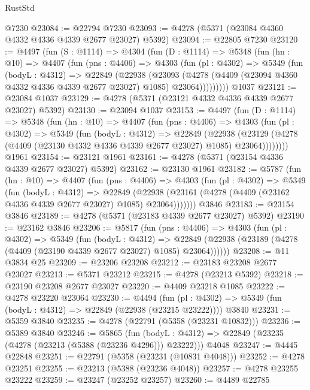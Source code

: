 \begin{lexlean}{RustStd}
\begin{coremodule}
{\begin{coremodule}
{{{{{{{{{{{{{{{{{{{{{{{{{{{{{{{{{{{    @7230
@23084 := @22794 @7230
@23093 := @4278 (@5371 (@23084 @4360 @4332 @4336 @4339 @2677 @23027) @5392)
@23094 := @22805 @7230
@23120 := @4497
    (fun (S : @1114) =>
    @4304
      (fun (D : @1114) =>
      @5348
        (fun (hn : @10) =>
        @4407
          (fun (pns : @4406) =>
          @4303
            (fun (pl : @4302) =>
            @5349
              (fun (bodyL : @4312) =>
              @22849
                (@22938
                  (@23093
                    (@4278
                      (@4409 (@23094 @4360 @4332 @4336 @4339 @2677 @23027) @1085)
                      @23064)))))))))
    @1037
@23121 := @23084 @1037
@23129 := @4278 (@5371 (@23121 @4332 @4336 @4339 @2677 @23027) @5392)
@23130 := @23094 @1037
@23153 := @4497
    (fun (D : @1114) =>
    @5348
      (fun (hn : @10) =>
      @4407
        (fun (pns : @4406) =>
        @4303
          (fun (pl : @4302) =>
          @5349
            (fun (bodyL : @4312) =>
            @22849
              (@22938
                (@23129 (@4278 (@4409 (@23130 @4332 @4336 @4339 @2677 @23027) @1085) @23064))))))))
    @1961
@23154 := @23121 @1961
@23161 := @4278 (@5371 (@23154 @4336 @4339 @2677 @23027) @5392)
@23162 := @23130 @1961
@23182 := @5787
    (fun (hn : @10) =>
    @4407
      (fun (pns : @4406) =>
      @4303
        (fun (pl : @4302) =>
        @5349
          (fun (bodyL : @4312) =>
          @22849
            (@22938 (@23161 (@4278 (@4409 (@23162 @4336 @4339 @2677 @23027) @1085) @23064)))))))
    @3846
@23183 := @23154 @3846
@23189 := @4278 (@5371 (@23183 @4339 @2677 @23027) @5392)
@23190 := @23162 @3846
@23206 := @5817
    (fun (pns : @4406) =>
    @4303
      (fun (pl : @4302) =>
      @5349
        (fun (bodyL : @4312) =>
        @22849 (@22938 (@23189 (@4278 (@4409 (@23190 @4339 @2677 @23027) @1085) @23064))))))
@23208 := @11 @3834 @25
@23209 := @23206 @23208
@23212 := @23183 @23208 @2677 @23027
@23213 := @5371 @23212
@23215 := @4278 (@23213 @5392)
@23218 := @23190 @23208 @2677 @23027
@23220 := @4409 @23218 @1085
@23222 := @4278 @23220 @23064
@23230 := @4494
    (fun (pl : @4302) => @5349 (fun (bodyL : @4312) => @22849 (@22938 (@23215 @23222))))
    @3840
@23231 := @5359 @3840
@23235 := @4278 (@22791 (@5358 (@23231 @10832)))
@23236 := @5389 @3840
@23246 := @5865
    (fun (bodyL : @4312) => @22849 (@23235 (@4278 (@23213 (@5388 (@23236 @4296))) @23222)))
    @4048
@23247 := @4445 @22848
@23251 := @22791 (@5358 (@23231 (@10831 @4048)))
@23252 := @4278 @23251
@23255 := @23213 (@5388 (@23236 @4048))
@23257 := @4278 @23255 @23222
@23259 := @23247 (@23252 @23257)
@23260 := @4489 @22785
}}}}}}}}}}}}}}}}}}}}}}}}}}}}}}}}}}}
\end{coremodule}}
\end{coremodule}
\end{lexlean}
